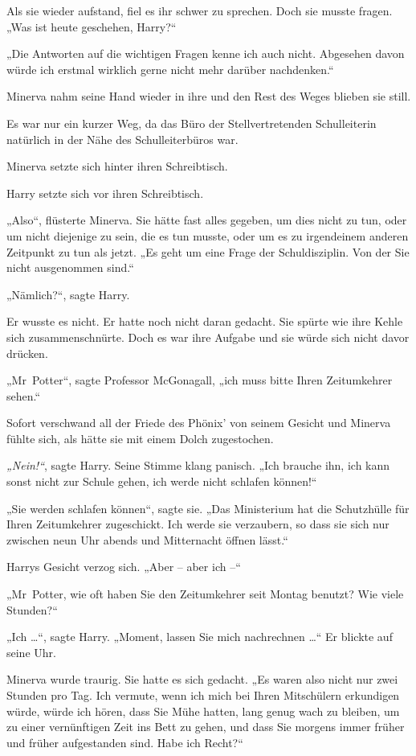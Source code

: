 {Als sie wieder aufstand, fiel es ihr schwer zu sprechen. Doch sie musste fragen. „Was ist heute geschehen, Harry?“

„Die Antworten auf die wichtigen Fragen kenne ich auch nicht. Abgesehen davon würde ich erstmal wirklich gerne nicht mehr darüber nachdenken.“

Minerva nahm seine Hand wieder in ihre und den Rest des Weges blieben sie still.

Es war nur ein kurzer Weg, da das Büro der Stellvertretenden Schulleiterin natürlich in der Nähe des Schulleiterbüros war.

Minerva setzte sich hinter ihren Schreibtisch.

Harry setzte sich vor ihren Schreibtisch.

„Also“, flüsterte Minerva. Sie hätte fast alles gegeben, um dies nicht zu tun, oder um nicht diejenige zu sein, die es tun musste, oder um es zu irgendeinem anderen Zeitpunkt zu tun als jetzt. „Es geht um eine Frage der Schuldisziplin. Von der Sie nicht ausgenommen sind.“

„Nämlich?“, sagte Harry.

Er wusste es nicht. Er hatte noch nicht daran gedacht. Sie spürte wie ihre Kehle sich zusammenschnürte. Doch es war ihre Aufgabe und sie würde sich nicht davor drücken.

„Mr~Potter“, sagte Professor McGonagall, „ich muss bitte Ihren Zeitumkehrer sehen.“

Sofort verschwand all der Friede des Phönix' von seinem Gesicht und Minerva fühlte sich, als hätte sie mit einem Dolch zugestochen.

\emph{„Nein!“}, sagte Harry. Seine Stimme klang panisch. „Ich brauche ihn, ich kann sonst nicht zur Schule gehen, ich werde nicht schlafen können!“

„Sie werden schlafen können“, sagte sie. „Das Ministerium hat die Schutzhülle für Ihren Zeitumkehrer zugeschickt. Ich werde sie verzaubern, so dass sie sich nur zwischen neun Uhr abends und Mitternacht öffnen lässt.“

Harrys Gesicht verzog sich. „Aber -- aber ich --“

„Mr~Potter, wie oft haben Sie den Zeitumkehrer seit Montag benutzt? Wie viele Stunden?“

„Ich …“, sagte Harry. „Moment, lassen Sie mich nachrechnen …“ Er blickte auf seine Uhr.

Minerva wurde traurig. Sie hatte es sich gedacht. „Es waren also nicht nur zwei Stunden pro Tag. Ich vermute, wenn ich mich bei Ihren Mitschülern erkundigen würde, würde ich hören, dass Sie Mühe hatten, lang genug wach zu bleiben, um zu einer vernünftigen Zeit ins Bett zu gehen, und dass Sie morgens immer früher und früher aufgestanden sind. Habe ich Recht?“

}
